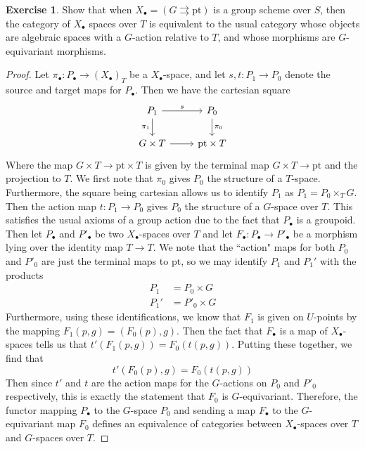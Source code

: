 \documentclass[psamsfonts, 12pt]{amsart}
\theoremstyle{definition}
\newtheorem{exer}[thm]{Exercise}
\theoremstyle{remark}
\begin{document}
%
\setcounter{section}{6}
%
\setcounter{thm}{2}
%
\begin{exer}
Show that when $X_\bullet = (G\rightrightarrows \mathrm{pt})$ is a group scheme
over $S$, then the category of $X_\bullet$ spaces over $T$ is equivalent to
the usual category whose objects are algebraic spaces with a $G$-action relative to
$T$, and whose morphisms are $G$-equivariant morphisms.
\end{exer}
%
\begin{proof}
Let $\pi_\bullet : P_\bullet \to (X_\bullet)_T$ be a $X_\bullet$-space, and let
$s,t : P_1 \to P_0$ denote the source and target maps for $P_\bullet$. Then we have the
cartesian square
\[\begin{tikzcd}
P_1 \ar[r, "s"] \ar[d, "\pi_1"']& P_0 \ar[d, "\pi_0"]\\
G\times T \ar[r] &  \mathrm{pt}\times T
\end{tikzcd}\]
Where the map $G \times T \to \mathrm{pt} \times T$ is given by the terminal map
$G \times T \to \mathrm{pt}$ and the projection to $T$. We first note that $\pi_0$
gives $P_0$ the structure of a $T$-space. Furthermore, the square being cartesian
allows us to identify $P_1$ as $P_1 = P_0 \times_T G$. Then the action map
$t : P_1 \to P_0$ gives $P_0$ the structure of a $G$-space over $T$. This
satisfies the usual axioms of a group action due to the fact that $P_\bullet$ is a
groupoid. \\

Then let $P_\bullet$ and $P'_\bullet$ be two $X_\bullet$-spaces over $T$ and let
$F_\bullet : P_\bullet \to P'_\bullet$ be a morphism lying over the identity map
$T \to T$. We note that the ``action" maps for both $P_0$ and $P'_0$ are just the
terminal maps to $\mathrm{pt}$, so we may identify $P_1$ and $P_1'$ with the products
\begin{align*}
P_1 &= P_0 \times G \\
P_1' &= P'_0\times G
\end{align*}
Furthermore, using these identifications, we know that $F_1$ is given on $U$-points by
the mapping $F_1(p,g) = (F_0(p),g)$. Then the fact that $F_\bullet$ is a map
of $X_\bullet$-spaces tells us that $t'(F_1(p,g)) = F_0(t(p,g))$. Putting these
together, we find that
\[
t'(F_0(p), g) = F_0(t(p,g))
\]
Then since $t'$ and $t$ are the action maps for the $G$-actions on $P_0$ and $P'_0$
respectively, this is exactly the statement that $F_0$ is $G$-equivariant. Therefore,
the functor mapping $P_\bullet$ to the $G$-space $P_0$ and sending a map
$F_\bullet$ to the $G$-equivariant map $F_0$ defines an equivalence of categories
between $X_\bullet$-spaces over $T$ and $G$-spaces over $T$.
\end{proof}
%
\end{document}
